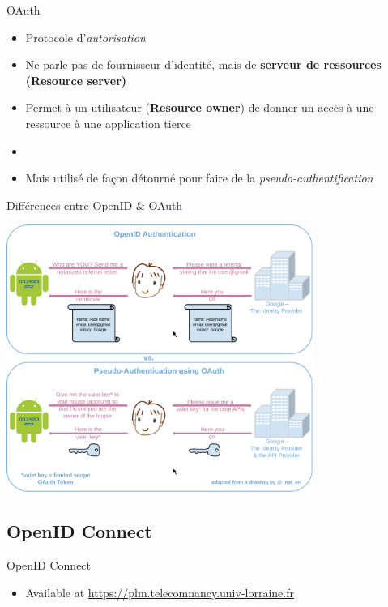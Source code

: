 \documentclass{beamer}
\begin{document}
\begin{frame}{OAuth}
  \begin{center}
    \begin{itemize}
      \item Protocole d'\emph{autorisation}
      \item Ne parle pas de fournisseur d'identité, mais de \textbf{serveur de ressources (Resource server)}
      \item Permet à un utilisateur (\textbf{Resource owner}) de donner un accès à une ressource à une application tierce
      \item[~]
      \item Mais utilisé de façon détourné pour faire de la \emph{pseudo-authentification}
    \end{itemize}
  \end{center}
\end{frame}

\begin{frame}{Différences entre OpenID \& OAuth}
  \begin{center}
    \includegraphics[width=0.75\textwidth]{img/OpenIDvsPseudo-AuthenticationusingOAuth}
  \end{center}
\end{frame}

\subsection{OpenID Connect}

\begin{frame}{OpenID Connect}
  \begin{center}
    \begin{itemize}
    \item Available at \url{https://plm.telecomnancy.univ-lorraine.fr}
    \end{itemize}
  \end{center}
\end{frame}
\end{document}
